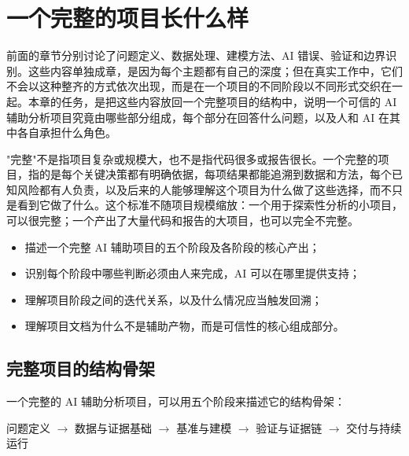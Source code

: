\chapter{一个完整的项目长什么样}

前面的章节分别讨论了问题定义、数据处理、建模方法、AI 错误、验证和边界识别。这些内容单独成章，是因为每个主题都有自己的深度；但在真实工作中，它们不会以这种整齐的方式依次出现，而是在一个项目的不同阶段以不同形式交织在一起。本章的任务，是把这些内容放回一个完整项目的结构中，说明一个可信的 AI 辅助分析项目究竟由哪些部分组成，每个部分在回答什么问题，以及人和 AI 在其中各自承担什么角色。

"完整"不是指项目复杂或规模大，也不是指代码很多或报告很长。一个完整的项目，指的是每个关键决策都有明确依据，每项结果都能追溯到数据和方法，每个已知风险都有人负责，以及后来的人能够理解这个项目为什么做了这些选择，而不只是看到它做了什么。这个标准不随项目规模缩放：一个用于探索性分析的小项目，可以很完整；一个产出了大量代码和报告的大项目，也可以完全不完整。

\begin{chapterguide}
\begin{itemize}
  \item 描述一个完整 AI 辅助项目的五个阶段及各阶段的核心产出；
  \item 识别每个阶段中哪些判断必须由人来完成，AI 可以在哪里提供支持；
  \item 理解项目阶段之间的迭代关系，以及什么情况应当触发回溯；
  \item 理解项目文档为什么不是辅助产物，而是可信性的核心组成部分。
\end{itemize}
\end{chapterguide}

\section{完整项目的结构骨架}

一个完整的 AI 辅助分析项目，可以用五个阶段来描述它的结构骨架：

\begin{center}
问题定义 $\rightarrow$ 数据与证据基础 $\rightarrow$ 基准与建模 $\rightarrow$ 验证与证据链 $\rightarrow$ 交付与持续运行
\end{center}

